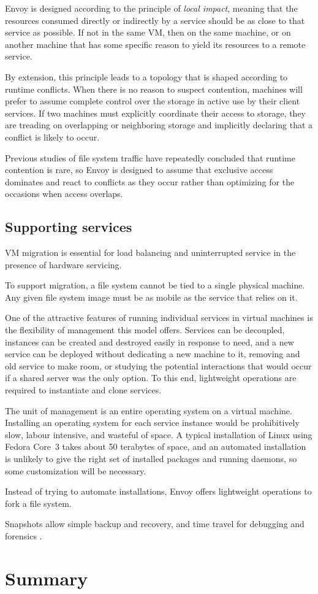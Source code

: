 Envoy is designed according to the principle of \textit{local impact}, meaning that the resources consumed directly or indirectly by a service should be as close to that service as possible. If not in the same VM, then on the same machine, or on another machine that has some specific reason to yield its resources to a remote service.

By extension, this principle leads to a topology that is shaped according to runtime conflicts. When there is no reason to suspect contention, machines will prefer to assume complete control over the storage in active use by their client services. If two machines must explicitly coordinate their access to storage, they are treading on overlapping or neighboring storage and implicitly declaring that a conflict is likely to occur.

Previous studies of file system traffic have repeatedly concluded that runtime contention is rare, so Envoy is designed to assume that exclusive access dominates and react to conflicts as they occur rather than optimizing for the occasions when access overlaps.

\subsection{Supporting services}

VM migration \cite{clark} is essential for load balancing and uninterrupted service in the presence of hardware servicing.

To support migration, a file system cannot be tied to a single physical machine. Any given file system image must be as mobile as the service that relies on it.

One of the attractive features of running individual services in virtual machines is the flexibility of management this model offers. Services can be decoupled, instances can be created and destroyed easily in response to need, and a new service can be deployed without dedicating a new machine to it, removing and old service to make room, or studying the potential interactions that would occur if a shared server was the only option. To this end, lightweight operations are required to instantiate and clone services.

The unit of management is an entire operating system on a virtual machine. Installing an operating system for each service instance would be prohibitively slow, labour intensive, and wasteful of space. A typical installation of Linux using Fedora Core~3 takes about 50 terabytes of space, and an automated installation is unlikely to give the right set of installed packages and running daemons, so some customization will be necessary.

Instead of trying to automate installations, Envoy offers lightweight operations to fork a file system.

Snapshots allow simple backup and recovery, and time travel for debugging and forensics \cite{whitaker}.

\section{Summary}
